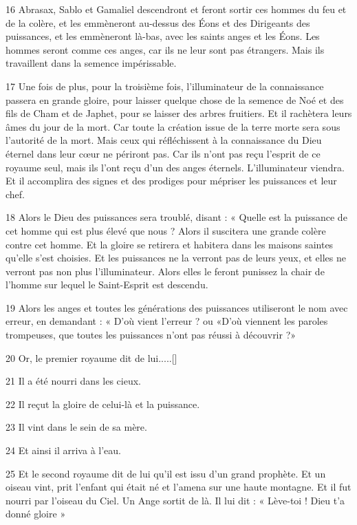 \par 16 Abrasax, Sablo et Gamaliel descendront et feront sortir ces hommes du feu et de la colère, et les emmèneront au-dessus des Éons et des Dirigeants des puissances, et les emmèneront là-bas, avec les saints anges et les Éons. Les hommes seront comme ces anges, car ils ne leur sont pas étrangers. Mais ils travaillent dans la semence impérissable.

\par 17 Une fois de plus, pour la troisième fois, l'illuminateur de la connaissance passera en grande gloire, pour laisser quelque chose de la semence de Noé et des fils de Cham et de Japhet, pour se laisser des arbres fruitiers. Et il rachètera leurs âmes du jour de la mort. Car toute la création issue de la terre morte sera sous l'autorité de la mort. Mais ceux qui réfléchissent à la connaissance du Dieu éternel dans leur cœur ne périront pas. Car ils n'ont pas reçu l'esprit de ce royaume seul, mais ils l'ont reçu d'un des anges éternels. L'illuminateur viendra. Et il accomplira des signes et des prodiges pour mépriser les puissances et leur chef.

\par 18 Alors le Dieu des puissances sera troublé, disant : « Quelle est la puissance de cet homme qui est plus élevé que nous ? Alors il suscitera une grande colère contre cet homme. Et la gloire se retirera et habitera dans les maisons saintes qu'elle s'est choisies. Et les puissances ne la verront pas de leurs yeux, et elles ne verront pas non plus l'illuminateur. Alors elles le feront punissez la chair de l'homme sur lequel le Saint-Esprit est descendu.

\par 19 Alors les anges et toutes les générations des puissances utiliseront le nom avec erreur, en demandant : « D'où vient l'erreur ? ou «D'où viennent les paroles trompeuses, que toutes les puissances n'ont pas réussi à découvrir ?»

\par 20 Or, le premier royaume dit de lui.....[]
\par 21 Il a été nourri dans les cieux.
\par 22 Il reçut la gloire de celui-là et la puissance.
\par 23 Il vint dans le sein de sa mère.
\par 24 Et ainsi il arriva à l'eau.
\par 25 Et le second royaume dit de lui qu'il est issu d'un grand prophète. Et un oiseau vint, prit l'enfant qui était né et l'amena sur une haute montagne. Et il fut nourri par l'oiseau du Ciel. Un Ange sortit de là. Il lui dit : « Lève-toi ! Dieu t’a donné gloire »

